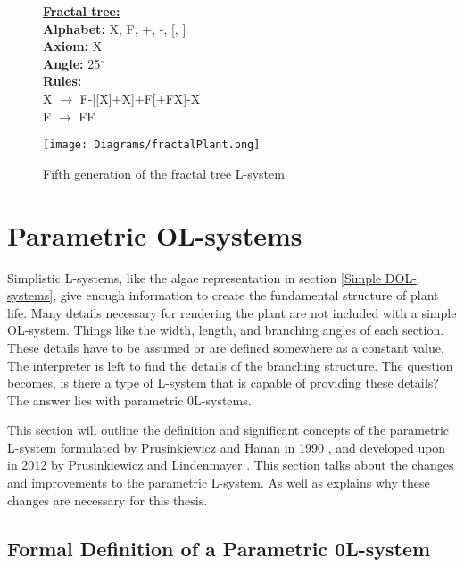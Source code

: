 \begin{figure}[htbp]
	\raggedright
	\textbf{\underline{Fractal tree:}} \\
	\textbf{Alphabet:} X, F, +, -, [, ] \\
	\textbf{Axiom:} X \\
	\textbf{Angle:} 25$^\circ$ \\
	\textbf{Rules:} \\
	X $\rightarrow$ F-[[X]+X]+F[+FX]-X\\
	F $\rightarrow$ FF \\
	\vspace{5mm}
	{\centering
		\vspace{7px}
		\texttt{[image: Diagrams/fractalPlant.png]}
		\caption{Fifth generation of the fractal tree L-system} \label{fractal plant}
	}
\end{figure}
\FloatBarrier

\section{Parametric OL-systems} \label{parametric}

Simplistic L-systems, like the algae representation in section \ref{Simple DOL-systems}, give enough information to create the fundamental structure of plant life. Many details necessary for rendering the plant are not included with a simple OL-system. Things like the width, length, and branching angles of each section. These details have to be assumed or are defined somewhere as a constant value. The interpreter is left to find the details of the branching structure. The question becomes, is there a type of L-system that is capable of providing these details? The answer lies with parametric 0L-systems.

This section will outline the definition and significant concepts of the parametric L-system formulated by Prusinkiewicz and Hanan in 1990 \cite{prusinkiewicz1990visualization}, and developed upon in 2012 by Prusinkiewicz and Lindenmayer \cite{prusinkiewicz2012algorithmic}. This section talks about the changes and improvements to the parametric L-system. As well as explains why these changes are necessary for this thesis.

\subsection{Formal Definition of a Parametric 0L-system} \label{definition of a parametric 0L-system section}

